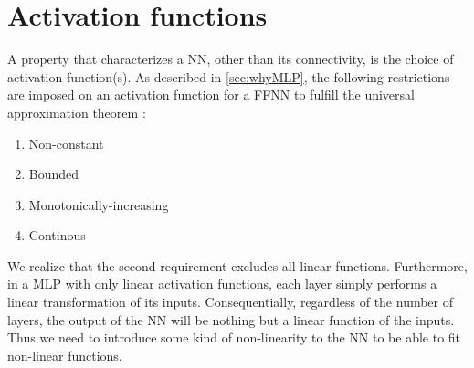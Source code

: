 \documentclass[twoside,english]{uiofysmaster}
\begin{document}
\section{Activation functions}
A property that characterizes a NN, other than its connectivity, is the choice of activation function(s). 
As described in \autoref{sec:whyMLP}, the following restrictions are imposed on an activation function for a FFNN
to fulfill the universal approximation theorem \cite{Hornik89}:
\begin{enumerate}
 \item Non-constant
 \item Bounded
 \item Monotonically-increasing
 \item Continous
\end{enumerate}
We realize that the second requirement excludes all linear functions. Furthermore, in a MLP with only linear activation functions, each 
layer simply performs a linear transformation of its inputs. Consequentially, regardless of the number of layers, 
the output of the NN will be nothing but a linear function of the inputs. Thus we need to introduce some kind of 
non-linearity to the NN to be able to fit non-linear functions. 
\end{document}
